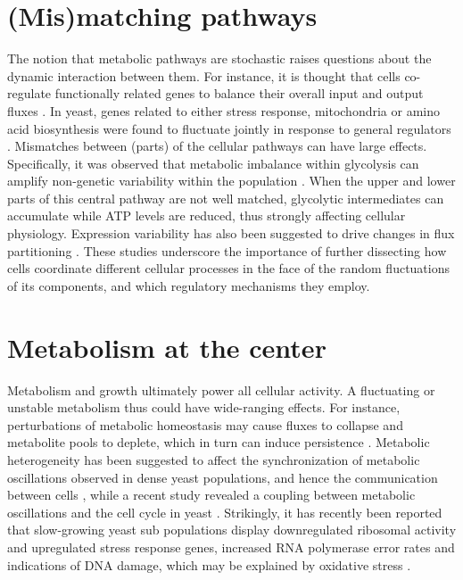 \section{(Mis)matching pathways}
The notion that metabolic pathways are stochastic raises questions about the dynamic interaction between them. For instance, it is thought that cells co-regulate functionally related genes to balance their overall input and output fluxes \cite{Hui2015, Chubukov2014}. In yeast, genes related to either stress response, mitochondria or amino acid biosynthesis were found to fluctuate jointly in response to general regulators \cite{Stewart-Ornstein2012}. Mismatches between (parts) of the cellular pathways can have large effects. Specifically, it was observed that metabolic imbalance within glycolysis can amplify non-genetic variability within the population \cite{vanHeerden2014}. When the upper and lower parts of this central pathway are not well matched, glycolytic intermediates can accumulate while ATP levels are reduced, thus strongly affecting cellular physiology. Expression variability has also been suggested to drive changes in flux partitioning \cite{Murima2016}. These studies underscore the importance of further dissecting how cells coordinate different cellular processes in the face of the random fluctuations of its components, and which regulatory mechanisms they employ.

\section{Metabolism at the center}
Metabolism and growth ultimately power all cellular activity. A fluctuating or unstable metabolism thus could have wide-ranging effects. For instance, perturbations of metabolic homeostasis may cause fluxes to collapse and metabolite pools to deplete, which in turn can induce persistence \cite{Radzikowski2016}. Metabolic heterogeneity has been suggested to affect the synchronization of metabolic oscillations observed in dense yeast populations, and hence the communication between cells \cite{Gustavsson2015}, while a recent study revealed a coupling between metabolic oscillations and the cell cycle in yeast \cite{Papagiannakis2017}. Strikingly, it has recently been reported that slow-growing yeast sub populations display downregulated ribosomal activity and upregulated stress response genes, increased RNA polymerase error rates and indications of DNA damage, which may be explained  by oxidative stress \cite{VanDijk2015}.

